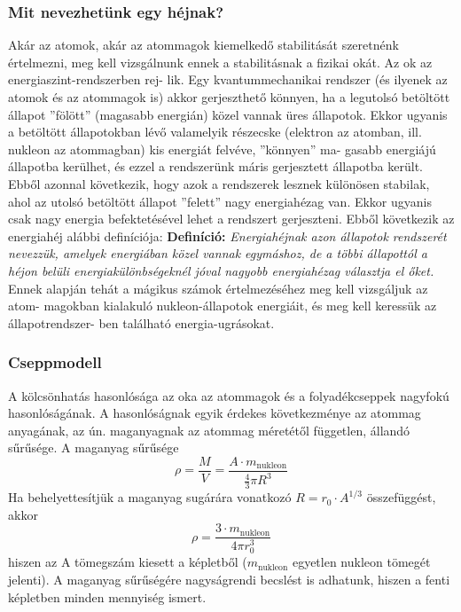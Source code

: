 \documentclass[../main.tex]{subfiles}
\begin{document}
\subsubsection*{Mit nevezhetünk egy héjnak?}
Akár az atomok, akár az atommagok kiemelkedő stabilitását szeretnénk értelmezni, meg
kell vizsgálnunk ennek a stabilitásnak a fizikai okát. Az ok az energiaszint-rendszerben rej-
lik. Egy kvantummechanikai rendszer (és ilyenek az atomok és az atommagok is) akkor
gerjeszthető könnyen, ha a legutolsó betöltött állapot ”fölött” (magasabb energián) közel
vannak üres állapotok. Ekkor ugyanis a betöltött állapotokban lévő valamelyik részecske
(elektron az atomban, ill. nukleon az atommagban) kis energiát felvéve, ”könnyen” ma-
gasabb energiájú állapotba kerülhet, és ezzel a rendszerünk máris gerjesztett állapotba
került. Ebből azonnal következik, hogy azok a rendszerek lesznek különösen stabilak,
ahol az utolsó betöltött állapot ”felett” nagy energiahézag van. Ekkor ugyanis csak nagy
energia befektetésével lehet a rendszert gerjeszteni. Ebből következik az energiahéj alábbi
definíciója:
\newline
\newline
\textbf{Definíció:} \textit{
    Energiahéjnak azon állapotok rendszerét nevezzük, amelyek energiában
közel vannak egymáshoz, de a többi állapottól a héjon belüli energiakülönbségeknél jóval
nagyobb energiahézag választja el őket.
}
\newline
\newline
Ennek alapján tehát a mágikus számok értelmezéséhez meg kell vizsgáljuk az atom-
magokban kialakuló nukleon-állapotok energiáit, és meg kell keressük az állapotrendszer-
ben található energia-ugrásokat.

\subsubsection{Cseppmodell}
A kölcsönhatás hasonlósága az oka az atommagok és a folyadékcseppek nagyfokú
hasonlóságának. A hasonlóságnak egyik érdekes következménye az atommag anyagának,
az ún. maganyagnak az atommag méretétől független, állandó sűrűsége. A maganyag
sűrűsége
\begin{equation}
    \rho = \frac{M}{V} = \frac{A \cdot m_{\text{nukleon}}}{\frac{4}{3} \pi R^3}
\end{equation}
Ha behelyettesítjük a maganyag sugárára vonatkozó $R = r_0 \cdot A^{1/3}$ összefüggést, akkor
\begin{equation}
    \rho = \frac{3 \cdot m_{\text{nukleon}}}{4 \pi r_0^3}
\end{equation}
hiszen az A tömegszám kiesett a képletből ($m_{\text{nukleon}}$ egyetlen nukleon tömegét jelenti). A
maganyag sűrűségére nagyságrendi becslést is adhatunk, hiszen a fenti képletben minden
mennyiség ismert.
\end{document}
